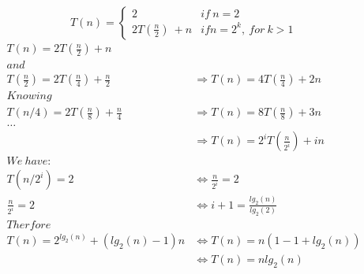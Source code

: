 \documentclass{article}
\begin{document}
\begin{equation}
T(n) =
\begin{cases}
2 &if \ n = 2 \\
2T(\frac{n}{2}) \ + n & if n = 2^k, \ for \ k > 1
\end{cases}
\end{equation}
\begin{align*}
T(n) = 2T(\frac{n}{2}) + n \\
and\\
T(\frac{n}{2}) = 2T(\frac{n}{4}) + \frac{n}{2}
&\Rightarrow T(n) = 4T(\frac{n}{4}) + 2n \\
Knowing\\
T(n/4) = 2T(\frac{n}{8}) + \frac{n}{4}
&\Rightarrow T(n) = 8T(\frac{n}{8}) + 3n \\
\ldots\\
&\Rightarrow T(n) = 2^i T(\frac{n}{2^i}) + in\\
We \ have:\\
T(n/2^i) = 2  & \Leftrightarrow \frac{n}{2^i} = 2 \\
\frac{n}{2^i} = 2   & \Leftrightarrow i + 1 = \frac{lg_2(n)}{lg_2(2)}\\
Therfore\\
T(n) = 2^{lg_2(n)}  + (lg_2(n) - 1) n  &
\Leftrightarrow T(n) = n (1 - 1 + lg_2(n)) \\
& \Leftrightarrow T(n) = nlg_2(n)
\end{align*}
\end{document}
